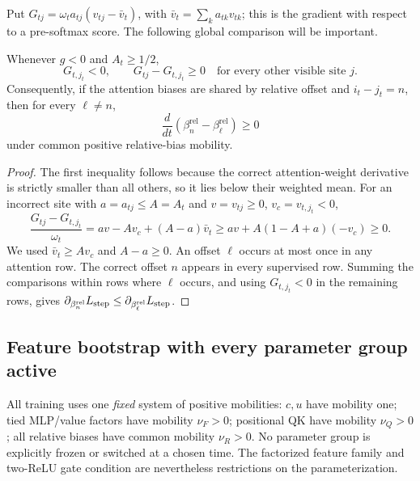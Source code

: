 Put $G_{tj}=\omega_ta_{tj}(v_{tj}-\bar v_t)$, with
$\bar v_t=\sum_ka_{tk}v_{tk}$; this is the gradient with respect to a
pre-softmax score.  The following global comparison will be important.

\begin{lrlemma}
\label{lem:lr-postrouting-gradient}
Whenever $g<0$ and $A_t\ge1/2$,
\begin{equation}\label{eq:lr-score-comparison}
 G_{t,j_t}<0,\qquad G_{tj}-G_{t,j_t}\ge0
 \quad\text{for every other visible site }j.
\end{equation}
Consequently, if the attention biases are shared by relative offset and
$i_t-j_t=n$, then for every $\ell\ne n$,
\begin{equation}\label{eq:lr-bias-gap-mono}
 \frac{d}{dt}
 (\beta_n^{\mathrm{rel}}-\beta_\ell^{\mathrm{rel}})\ge0
\end{equation}
under common positive relative-bias mobility.
\end{lrlemma}
\begin{proof}
The first inequality follows because the correct attention-weight
derivative is strictly smaller than all others, so it lies below their
weighted mean.  For an incorrect site with $a=a_{tj}\le A=A_t$ and
$v=v_{tj}\ge0$, $v_c=v_{t,j_t}<0$,
\[
 \frac{G_{tj}-G_{t,j_t}}{\omega_t}
 =av-Av_c+(A-a)\bar v_t
 \ge av+A(1-A+a)(-v_c)\ge0.
\]
We used $\bar v_t\ge Av_c$ and $A-a\ge0$.
An offset $\ell$ occurs at most once in any attention row.  The correct
offset $n$ appears in every supervised row.  Summing the comparisons
within rows where $\ell$ occurs, and using $G_{t,j_t}<0$ in the
remaining rows, gives
$\partial_{\beta_n^{\mathrm{rel}}}L_{\mathrm{step}}
\le\partial_{\beta_\ell^{\mathrm{rel}}}L_{\mathrm{step}}$.
\end{proof}

\subsection{Feature bootstrap with every parameter group active}
\label{app:weak-routing-bootstrap}

All training uses one \emph{fixed} system of positive mobilities:
$c,u$ have mobility one; tied MLP/value factors have mobility
$\nu_F>0$; positional QK have mobility $\nu_Q>0$; all relative biases
have common mobility $\nu_R>0$.
No parameter group is explicitly frozen or switched at a chosen time.
The factorized feature family and two-ReLU gate condition are nevertheless
restrictions on the parameterization.

